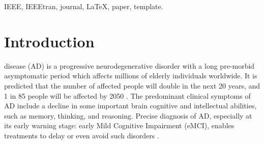 \documentclass[journal]{IEEEtran}
\begin{document}
	
	
	\begin{IEEEkeywords}
		IEEE, IEEEtran, journal, \LaTeX, paper, template.
	\end{IEEEkeywords}
	
	
	
	
	
	
	\IEEEpeerreviewmaketitle
	
	
	
	\section{Introduction}
	 disease (AD) is a progressive neurodegenerative disorder with a long pre-morbid asymptomatic period \cite{r01} which affects millions of elderly individuals worldwide. It is predicted that the number of affected people will double in the next 20 years, and 1 in 85 people will be affected by 2050 \cite{r02}. The predominant clinical symptoms of AD include a decline in some important brain cognitive and intellectual abilities, such as memory, thinking, and reasoning. Precise diagnosis of AD, especially at its early warning stage: early Mild Cognitive Impairment (eMCI), enables treatments to delay or even avoid such disorders \cite{r03}.  
	
\end{document}
